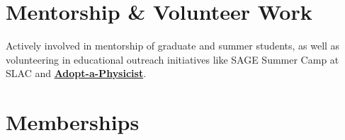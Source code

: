 \documentclass[11pt,a4paper,sans]{moderncv}        %
\begin{document}
\section{Mentorship \& Volunteer Work}
Actively involved in mentorship of graduate and summer students, as well as volunteering in educational outreach initiatives like SAGE Summer Camp at SLAC and \hyperlink{https://www.adoptaphysicist.org/}{\color{blue}\textbf{Adopt-a-Physicist}}.

\section{Memberships}

\iffalse
\section{Recent Volunteer Work}
\cvitemwithcomment{Feb. 2021}{Cabrillo High School STEM Talk}{}
\cvitemwithcomment{Aug. 2019}{SAGE-S Summer Camp for Girls, SLAC}{}
\cvitemwithcomment{Jan. 2020}{Science Bowl, SLAC}{}
\cvitemwithcomment{Otc. 2017, 2018, 2020}{Adopt-a-Physicist}{}


\section{Programming Languages}
\cvitem{Proficient in}{ASTRA, OPAL-T, Python, MATLAB}
\cvitem{Prior experience with}{IMPACT, Genesis, C/C++}

\fi
\end{document}
